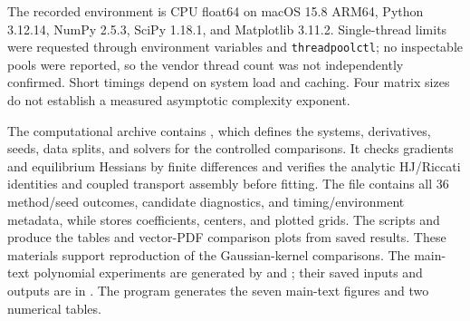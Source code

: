 \documentclass[11pt]{article}
\theoremstyle{plain}      %
\theoremstyle{definition} %
\begin{document}
The recorded environment is CPU float64 on macOS 15.8 ARM64, Python 3.12.14, NumPy 2.5.3, SciPy 1.18.1, and Matplotlib 3.11.2. Single-thread limits were requested through environment variables and \texttt{threadpoolctl}; no inspectable pools were reported, so the vendor thread count was not independently confirmed. Short timings depend on system load and caching. Four matrix sizes do not establish a measured asymptotic complexity exponent.

The computational archive contains , which defines the systems, derivatives, seeds, data splits, and solvers for the controlled comparisons. It checks gradients and equilibrium Hessians by finite differences and verifies the analytic HJ/Riccati identities and coupled transport assembly before fitting. The file  contains all 36 method/seed outcomes, candidate diagnostics, and timing/environment metadata, while  stores coefficients, centers, and plotted grids. The scripts  and  produce the tables and vector-PDF comparison plots from saved results. These materials support reproduction of the Gaussian-kernel comparisons. The main-text polynomial experiments are generated by  and ; their saved inputs and outputs are in . The program  generates the seven main-text figures and two numerical tables.

\FloatBarrier



\end{document}
